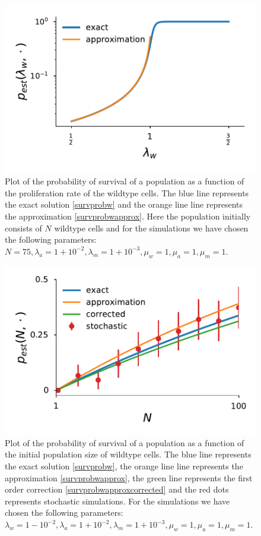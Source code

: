 \documentclass[11pt,a4paper]{article}
\begin{document}
\begin{figure}[!t]
 \vspace*{1\baselineskip}
\includegraphics[width=1\textwidth]{SurvPlot.pdf}
\caption{Plot of the probability of survival of a population as a function of the proliferation rate of the wildtype cells. The blue line represents the exact solution \eqref{survprobw} and the orange line line represents the approximation \eqref{survprobwapprox}. Here the population initially consists of $N$ wildtype cells and for the simulations we have chosen the following parameters: $N=75, \lambda_a=1+10^{-2},\lambda_m=1+10^{-3},\mu_w=1,\mu_a=1,\mu_m=1.$}
\label{SurvPlot}
\end{figure}

\begin{figure}[!t]
 \vspace*{1\baselineskip}
\includegraphics[width=1\textwidth]{SurvPlotNData.pdf}
\caption{Plot of the probability of survival of a population as a function of the initial population size of wildtype cells. The blue line represents the exact solution \eqref{survprobw}, the orange line line represents the approximation \eqref{survprobwapprox}, the green line represents the first order correction \eqref{survprobwapproxcorrected} and the red dots represents stochastic simulations. For the simulations we have chosen the following parameters: $\lambda_w=1-10^{-2}, \lambda_a=1+10^{-2},\lambda_m=1+10^{-3},\mu_w=1,\mu_a=1,\mu_m=1.$}
\label{SurvPlotNData}
\end{figure}
\end{document}
